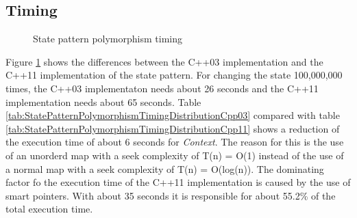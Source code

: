 {%
\subsection{Timing}\label{sec:timingStatePatternPolymorphism}
 
\begin{figure}[h]{}
\centering
\mbox{}
\caption{State pattern polymorphism timing}
\label{fig:statePatternPolymorphismTiming}
\end{figure}

\noindent Figure \ref{fig:statePatternPolymorphismTiming} shows the differences between the C++03 implementation and the C++11 implementation of the state pattern. For changing the state 100,000,000 times, the C++03 implementaton needs about 26 seconds and the C++11 implementation needs about 65 seconds. Table \ref{tab:StatePatternPolymorphismTimingDistributionCpp03} compared with table \ref{tab:StatePatternPolymorphismTimingDistributionCpp11} shows a reduction of the execution time of about 6 seconds for \emph{Context}. The reason for this is the use of an unorderd map with a seek complexity of T(n) = O(1) instead of the use of a normal map with a seek complexity of T(n) = O(log(n)). The dominating factor fo the execution time of the C++11 implementation is caused by the use of smart pointers. With about 35 seconds it is responsible for about 55.2\% of the total execution time.

}

